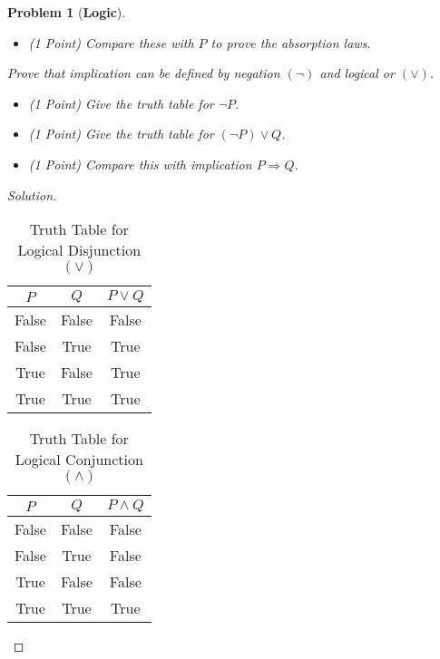 \documentclass{article}
\theoremstyle{normal}
\newtheorem{problem}{Problem}
\begin{document}
\begin{problem}[\textbf{Logic}]
\begin{itemize}
            \item (1 Point) Compare these with $P$ to prove the absorption laws.
        \end{itemize}
        Prove that implication can be defined by
        \textit{negation} $(\neg)$ and \textit{logical or} $(\lor)$.
        \begin{itemize}
            \item (1 Point) Give the truth table for $\neg{P}$.
            \item (1 Point) Give the truth table for $(\neg{P})\lor{Q}$.
            \item (1 Point) Compare this with implication $P\Rightarrow{Q}$.
        \end{itemize}
    \end{problem}
    \clearpage
    \color{black}
    \begin{proof}[Solution]
        \par\hfill\par
        \begin{table}[H]
            \centering
            \begin{tabular}{ c | c | c }
                $P$&$Q$&$P\lor{Q}$\\
                \hline
                False&False&False\\
                False&True&True\\
                True&False&True\\
                True&True&True
            \end{tabular}
            \caption{Truth Table for Logical Disjunction $(\lor)$}
            \label{tab:logical_disjunction}
        \end{table}
        \begin{table}[H]
            \centering
            \begin{tabular}{ c | c | c }
                $P$&$Q$&$P\land{Q}$\\
                \hline
                False&False&False\\
                False&True&False\\
                True&False&False\\
                True&True&True
            \end{tabular}
            \caption{Truth Table for Logical Conjunction $(\land)$}
            \label{tab:logical_conjunction}
        \end{table}
        \begin{table}[H]

\end{table}
\end{proof}
\end{document}
